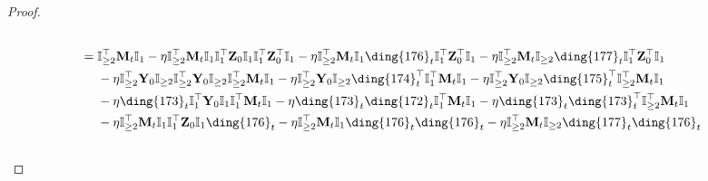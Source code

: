 \documentclass{article}
\theoremstyle{plain}
\theoremstyle{remark}
\def\bY{\mathbf{Y}}
\def\bZ{\mathbf{Z}}
\newcommand{\cc}[1]{\text{\ding{\number\numexpr#1 + 171\relax}}}
\begin{document}
\begin{proof}
\begin{align*}
        \\
        &=
            \mathbb{I}_{\ge2}^\top\mathbf{M}_{t}\mathbb{I}_{1}
            - \eta\mathbb{I}_{\ge2}^\top \mathbf{M}_{t}\mathbb{I}_{1}\mathbb{I}_{1}^\top\bZ_0\mathbb{I}_{1}\mathbb{I}_{1}^\top \bZ_0^\top\mathbb{I}_{1} 
            - \eta\mathbb{I}_{\ge2}^\top \mathbf{M}_{t}\mathbb{I}_{1}\cc{5}_t\mathbb{I}_{1}^\top \bZ_0^\top\mathbb{I}_{1} 
            - \eta\mathbb{I}_{\ge2}^\top \mathbf{M}_{t}\mathbb{I}_{\ge2}\cc{6}_t\mathbb{I}_{1}^\top \bZ_0^\top\mathbb{I}_{1} 
        \\
        &~~~~ 
            - \eta \mathbb{I}_{\ge2}^\top \bY_0 \mathbb{I}_{\ge2}\mathbb{I}_{\ge2}^\top \bY_0\mathbb{I}_{\ge 2}\mathbb{I}_{\ge 2}^\top\mathbf{M}_{t} \mathbb{I}_{1}
            - \eta \mathbb{I}_{\ge2}^\top \bY_0 \mathbb{I}_{\ge2}\cc{3}_t^\top\mathbb{I}_{1}^\top\mathbf{M}_{t} \mathbb{I}_{1}
            - \eta \mathbb{I}_{\ge2}^\top \bY_0 \mathbb{I}_{\ge2}\cc{4}_t^\top\mathbb{I}_{\ge2}^\top\mathbf{M}_{t} \mathbb{I}_{1}
        \\
        &~~~~ 
            -\eta \cc{2}_t \mathbb{I}_{1}^\top\bY_0\mathbb{I}_{1}\mathbb{I}_{1}^\top\mathbf{M}_{t}\mathbb{I}_{1} 
            -\eta \cc{2}_t \cc{1}_t\mathbb{I}_{1}^\top\mathbf{M}_{t}\mathbb{I}_{1} 
            -\eta \cc{2}_t \cc{2}_t^\top\mathbb{I}_{\ge2}^\top\mathbf{M}_{t}\mathbb{I}_{1} 
        \\
        &~~~~ 
            - \eta\mathbb{I}_{\ge2}^\top \mathbf{M}_{t}\mathbb{I}_{1}\mathbb{I}_{1}^\top\bZ_0\mathbb{I}_{1}\cc{5}_t 
            - \eta\mathbb{I}_{\ge2}^\top \mathbf{M}_{t}\mathbb{I}_{1}\cc{5}_t\cc{5}_t 
            - \eta\mathbb{I}_{\ge2}^\top \mathbf{M}_{t}\mathbb{I}_{\ge2}\cc{6}_t\cc{5}_t 
        \\
        &~~~~ 

\end{align*}
\end{proof}
\end{document}
